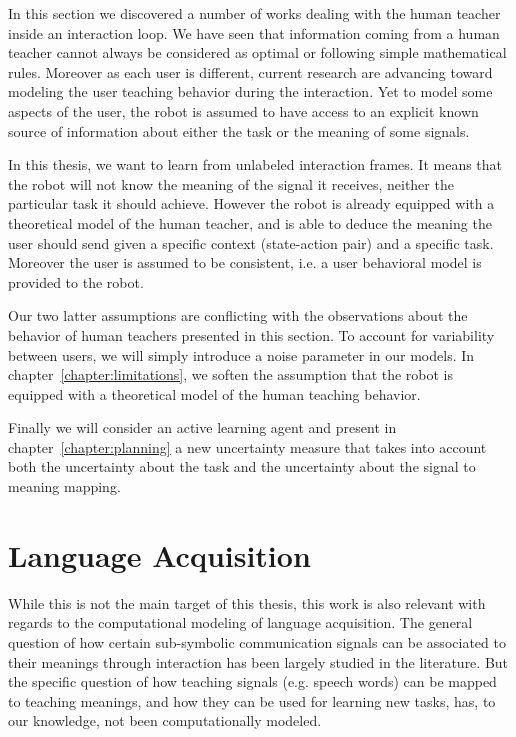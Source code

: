 In this section we discovered a number of works dealing with the human teacher inside an interaction loop. We have seen that information coming from a human teacher cannot always be considered as optimal or following simple mathematical rules. Moreover as each user is different, current research are advancing toward modeling the user teaching behavior during the interaction. Yet to model some aspects of the user, the robot is assumed to have access to an explicit known source of information about either the task or the meaning of some signals.


In this thesis, we want to learn from unlabeled interaction frames. It means that the robot will not know the meaning of the signal it receives, neither the particular task it should achieve. However the robot is already equipped with a theoretical model of the human teacher, and is able to deduce the meaning the user should send given a specific context (state-action pair) and a specific task. Moreover the user is assumed to be consistent, i.e. a user behavioral model is provided to the robot.

Our two latter assumptions are conflicting with the observations about the behavior of human teachers presented in this section. To account for variability between users, we will simply introduce a noise parameter in our models. In chapter~\ref{chapter:limitations}, we soften the assumption that the robot is equipped with a theoretical model of the human teaching behavior.

Finally we will consider an active learning agent and present in chapter~\ref{chapter:planning} a new uncertainty measure that takes into account both the uncertainty about the task and the uncertainty about the signal to meaning mapping.

\section{Language Acquisition}
\label{chapter:related:language}

While this is not the main target of this thesis, this work is also relevant with regards to the computational modeling of language acquisition. The general question of how certain sub-symbolic communication signals can be associated to their meanings through interaction has been largely studied in the literature. But the specific question of how teaching signals (e.g. speech words) can be mapped to teaching meanings, and how they can be used for learning new tasks, has, to our knowledge, not been computationally modeled.

